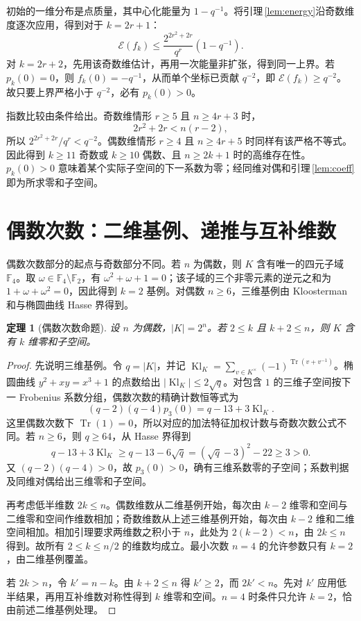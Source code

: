 \documentclass[UTF8,a4paper,11pt]{ctexart}
\numberwithin{equation}{section}
\newtheorem{theorem}{定理}[section]
\theoremstyle{definition}
\theoremstyle{remark}
\begin{document}
初始的一维分布是点质量，其中心化能量为 $1-q^{-1}$。将引理\,\ref{lem:energy}沿奇数维度逐次应用，得到对于 $k=2r+1$：
\[
 \mathcal E(f_k)\le \frac{2^{2r^2+2r}}{q^r}(1-q^{-1}).
\]
对 $k=2r+2$，先用该奇数维估计，再用一次能量非扩张，得到同一上界。若 $p_k(0)=0$，则 $f_k(0)=-q^{-1}$，从而单个坐标已贡献 $q^{-2}$，即 $\mathcal E(f_k)\ge q^{-2}$。故只要上界严格小于 $q^{-2}$，必有 $p_k(0)>0$。

指数比较由条件给出。奇数维情形 $r\ge5$ 且 $n\ge4r+3$ 时，
\[
 2r^2+2r<n(r-2),
\]
所以 $2^{2r^2+2r}/q^r<q^{-2}$。偶数维情形 $r\ge4$ 且 $n\ge4r+5$ 时同样有该严格不等式。因此得到 $k\ge11$ 奇数或 $k\ge10$ 偶数、且 $n\ge2k+1$ 时的高维存在性。$p_k(0)>0$ 意味着某个实际子空间的下一系数为零；经同维对偶和引理\,\ref{lem:coeff}即为所求零和子空间。

\section{偶数次数：二维基例、递推与互补维数}

偶数次数部分的起点与奇数部分不同。若 $n$ 为偶数，则 $K$ 含有唯一的四元子域 $\mathbb F_4$。取 $\omega\in\mathbb F_4\setminus\mathbb F_2$，有 $\omega^2+\omega+1=0$；该子域的三个非零元素的逆元之和为 $1+\omega+\omega^2=0$，因此得到 $k=2$ 基例。对偶数 $n\ge6$，三维基例由 Kloosterman 和与椭圆曲线 Hasse 界得到。

\begin{theorem}[偶数次数命题]\label{thm:even}
设 $n$ 为偶数，$|K|=2^n$。若 $2\le k$ 且 $k+2\le n$，则 $K$ 含有 $k$ 维零和子空间。
\end{theorem}
\begin{proof}
先说明三维基例。令 $q=|K|$，并记 $\operatorname{Kl}_K=\sum_{v\in K^\times}(-1)^{\operatorname{Tr}(v+v^{-1})}$。椭圆曲线 $y^2+xy=x^3+1$ 的点数给出 $|\operatorname{Kl}_K|\le2\sqrt q$。对包含 $1$ 的三维子空间按下一 Frobenius 系数分组，偶数次数的精确计数恒等式为
\[
 (q-2)(q-4)p_3(0)=q-13+3\operatorname{Kl}_K.
\]
这里偶数次数下 $\operatorname{Tr}(1)=0$，所以对应的加法特征加权计数与奇数次数公式不同。若 $n\ge6$，则 $q\ge64$，从 Hasse 界得到
\[
q-13+3\operatorname{Kl}_K\ge q-13-6\sqrt q=(\sqrt q-3)^2-22\ge3>0.
\]
又 $(q-2)(q-4)>0$，故 $p_3(0)>0$，确有三维系数零的子空间；系数判据及同维对偶给出三维零和子空间。

再考虑低半维数 $2k\le n$。偶数维数从二维基例开始，每次由 $k-2$ 维零和空间与二维零和空间作维数相加；奇数维数从上述三维基例开始，每次由 $k-2$ 维和二维空间相加。相加引理要求两维数之积小于 $n$，此处为 $2(k-2)<n$，由 $2k\le n$ 得到。故所有 $2\le k\le n/2$ 的维数均成立。最小次数 $n=4$ 的允许参数只有 $k=2$，由二维基例覆盖。

若 $2k>n$，令 $k'=n-k$。由 $k+2\le n$ 得 $k'\ge2$，而 $2k'<n$。先对 $k'$ 应用低半结果，再用互补维数对称性得到 $k$ 维零和空间。$n=4$ 时条件只允许 $k=2$，恰由前述二维基例处理。
\end{proof}
\end{document}
